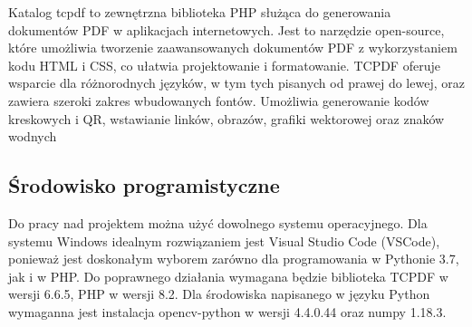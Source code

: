 \documentclass[12pt,a4paper,oneside]{article}
\theoremstyle{definition}
\numberwithin{equation}{section}
\begin{document}
Katalog tcpdf to zewnętrzna biblioteka PHP służąca do generowania dokumentów PDF w aplikacjach internetowych. Jest to narzędzie open-source, które umożliwia tworzenie zaawansowanych dokumentów PDF z wykorzystaniem kodu HTML i CSS, co ułatwia projektowanie i formatowanie. TCPDF oferuje wsparcie dla różnorodnych języków, w tym tych pisanych od prawej do lewej, oraz zawiera szeroki zakres wbudowanych fontów. Umożliwia generowanie kodów kreskowych i QR, wstawianie linków, obrazów, grafiki wektorowej oraz znaków wodnych



\subsection{Środowisko programistyczne}

Do pracy nad projektem można użyć dowolnego systemu operacyjnego. Dla systemu Windows idealnym rozwiązaniem jest Visual Studio Code (VSCode), ponieważ jest doskonałym wyborem zarówno dla programowania w Pythonie 3.7, jak i w PHP. Do poprawnego działania wymagana będzie biblioteka TCPDF w wersji 6.6.5, PHP w wersji 8.2. Dla środowiska napisanego w języku Python wymaganna jest instalacja opencv-python w wersji 4.4.0.44 oraz numpy 1.18.3. 


























%
%
%
\end{document}
